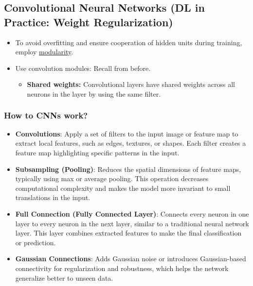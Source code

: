 \subsection{Convolutional Neural Networks (DL in Practice: Weight Regularization)}
\begin{summary}
    \begin{itemize}
        \item To avoid overfitting and ensure cooperation of hidden units during training, employ \underline{modularity}.
        \item Use convolution modules: Recall from before.
        \begin{itemize}
            \item \textbf{Shared weights:} Convolutional layers have shared weights across all neurons in the layer by using the same filter.
        \end{itemize}
    \end{itemize}
\end{summary}

\subsubsection{How to CNNs work?}
\begin{summary}
    \begin{itemize}
        \item \textbf{Convolutions}: Apply a set of filters to the input image or feature map to extract local features, such as edges, textures, or shapes. Each filter creates a feature map highlighting specific patterns in the input.
    
        \item \textbf{Subsampling (Pooling)}: Reduces the spatial dimensions of feature maps, typically using max or average pooling. This operation decreases computational complexity and makes the model more invariant to small translations in the input.
    
        \item \textbf{Full Connection (Fully Connected Layer)}: Connects every neuron in one layer to every neuron in the next layer, similar to a traditional neural network layer. This layer combines extracted features to make the final classification or prediction.
    
        \item \textbf{Gaussian Connections}: Adds Gaussian noise or introduces Gaussian-based connectivity for regularization and robustness, which helps the network generalize better to unseen data.
    \end{itemize}    
\end{summary}

